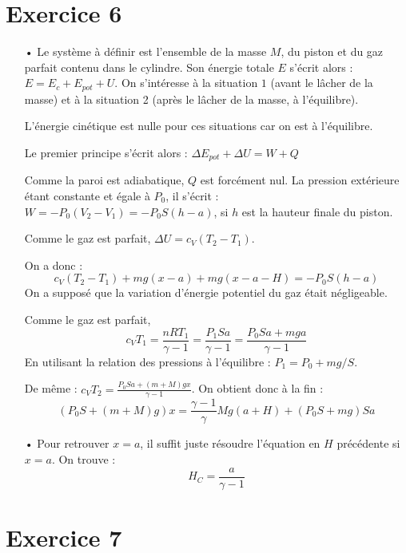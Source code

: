 \documentclass{report}
\begin{document}
\section*{Exercice 6}

\begin{itemize}
\item[•] Le système à définir est l'ensemble de la masse $M$, du piston et du gaz parfait contenu dans le cylindre. Son énergie totale $E$ s'écrit alors :$E = E_c + E_{pot} + U$. On s'intéresse à la situation $1$ (avant le lâcher de la masse) et à la situation 2 (après le lâcher de la masse, à l'équilibre).

L'énergie cinétique est nulle pour ces situations car on est à l'équilibre. 

Le premier principe s'écrit alors : $\Delta E_{pot} +\Delta U = W + Q$

Comme la paroi est adiabatique, $Q$ est forcément nul. La pression extérieure étant constante et égale à $P_0$, il s'écrit : $W=-P_0(V_2-V_1)=-P_0S(h-a)$, si $h$ est la hauteur finale du piston.

Comme le gaz est parfait, $\Delta U = c_V(T_2-T_1)$.

On a donc :
\begin{equation}
	c_V(T_2-T_1) + mg(x-a) + mg(x-a-H)=-P_0S(h-a)
\end{equation}
On a supposé que la variation d'énergie potentiel du gaz était négligeable. 

Comme le gaz est parfait, 
\begin{equation}
c_VT_1=\frac{nRT_1}{\gamma-1}=\frac{P_1Sa}{\gamma-1}=\frac{P_0Sa+mga}{\gamma-1}
\end{equation}
En utilisant la relation des pressions à l'équilibre : $P_1=P_0+mg/S$.

De même : $c_VT_2=\frac{P_0Sa+(m+M)gx}{\gamma-1}$.
On obtient donc à la fin :
\begin{equation}
	(P_0S+(m+M)g)x = \frac{\gamma-1}{\gamma}Mg(a+H)+(P_0S+mg)Sa
\end{equation}

\item[•] Pour retrouver $x=a$, il suffit juste résoudre l'équation en $H$ précédente si $x=a$. On trouve :
\begin{equation}
	H_C=\frac{a}{\gamma-1}
\end{equation}

\end{itemize}

\section*{Exercice 7}
\end{document}
